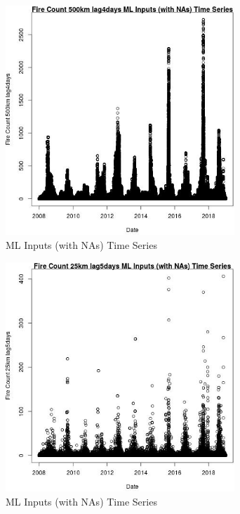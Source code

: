 \begin{figure} 
\centering  
\includegraphics[width=0.77\textwidth]{Code_Outputs/Report_ML_input_PM25_Step4_part_f_de_duplicated_aveswNAs_Fire_Count_500km_lag4daysvDate.jpg} 
\caption{\label{fig:Report_ML_input_PM25_Step4_part_f_de_duplicated_aveswNAsFire_Count_500km_lag4daysvDate}ML Inputs (with NAs) Time Series} 
\end{figure} 
 

\begin{figure} 
\centering  
\includegraphics[width=0.77\textwidth]{Code_Outputs/Report_ML_input_PM25_Step4_part_f_de_duplicated_aveswNAs_Fire_Count_25km_lag5daysvDate.jpg} 
\caption{\label{fig:Report_ML_input_PM25_Step4_part_f_de_duplicated_aveswNAsFire_Count_25km_lag5daysvDate}ML Inputs (with NAs) Time Series} 
\end{figure} 
 

